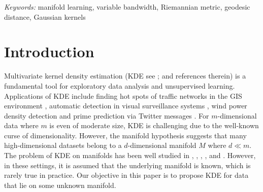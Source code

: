 \documentclass[12pt]{article}
\begin{document}
\noindent%
{\it Keywords:} manifold learning, variable bandwidth, Riemannian metric, geodesic distance, Gaussian kernels
  \vfill

  \newpage

\hypertarget{dckdeintro}{%
\section{Introduction}\label{dckdeintro}}

Multivariate kernel density estimation (KDE see \textcite{Parzen1962-gt}; \textcite{Scott2015-vl} and references therein) is a fundamental tool for exploratory data analysis and unsupervised learning. Applications of KDE include finding hot spots of traffic networks in the GIS environment \autocite{Xie2008-eb,Okabe2009-nb}, automatic detection in visual surveillance systems \autocite{Elgammal2002-cw}, wind power density detection \autocite{Jeon2012-ac} and prime prediction via Twitter messages \autocite{Gerber2014-tq}. For \(m\)-dimensional data where \(m\) is even of moderate size, KDE is challenging due to the well-known curse of dimensionality. However, the manifold hypothesis suggests that many high-dimensional datasets belong to a \(d\)-dimensional manifold \(M\) where \(d\ll m\). The problem of KDE on manifolds has been well studied in \textcite{Hendriks1990-bt}, \textcite{Izenman1991-cj}, \textcite{Pelletier2005-vu}, \textcite{Henry2013-da}, and \textcite{Berenfeld2022-fd}. However, in these settings, it is assumed that the underlying manifold is known, which is rarely true in practice. Our objective in this paper is to propose KDE for data that lie on some unknown manifold.
\end{document}
